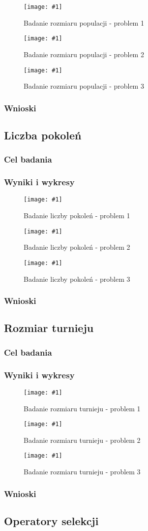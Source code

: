 \documentclass[12pt,a4paper]{article}
\newcommand{\image}[2] {
    \begin{figure}[H]
        \begin{center}
            \texttt{[image: \#1]}
        \end{center}
        \caption{#2}
        \label{#1}
    \end{figure}
}
\begin{document}
\image{images/Badanie rozmiaru populacji_1}{Badanie rozmiaru populacji - problem 1}
\image{images/Badanie rozmiaru populacji_2}{Badanie rozmiaru populacji - problem 2}
\image{images/Badanie rozmiaru populacji_3}{Badanie rozmiaru populacji - problem 3}
\subsubsection{Wnioski}
\subsection{Liczba pokoleń}
\subsubsection{Cel badania}
\subsubsection{Wyniki i wykresy}
\image{images/Badanie liczby generacji_1}{Badanie liczby pokoleń - problem 1}
\image{images/Badanie liczby generacji_2}{Badanie liczby pokoleń - problem 2}
\image{images/Badanie liczby generacji_3}{Badanie liczby pokoleń - problem 3}
\subsubsection{Wnioski}
\subsection{Rozmiar turnieju}
\subsubsection{Cel badania}
\subsubsection{Wyniki i wykresy}
\image{images/Badanie rozmiaru turnieju_1}{Badanie rozmiaru turnieju - problem 1}
\image{images/Badanie rozmiaru turnieju_2}{Badanie rozmiaru turnieju - problem 2}
\image{images/Badanie rozmiaru turnieju_3}{Badanie rozmiaru turnieju - problem 3}
\subsubsection{Wnioski}
\subsection{Operatory selekcji}
\end{document}

